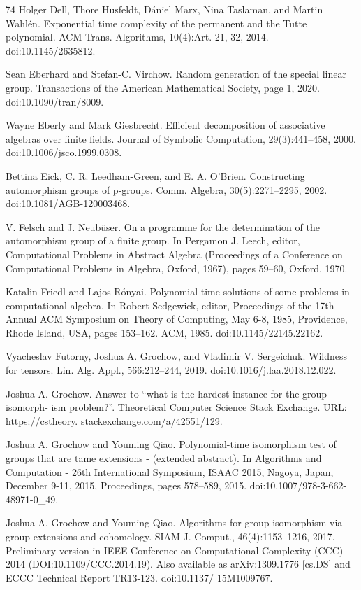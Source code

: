 \documentclass[10pt,a4paper]{article}
\begin{document}
\begin{thebibliography}{74}
Holger Dell, Thore Husfeldt, Dániel Marx, Nina Taslaman, and Martin Wahlén. Exponential time complexity of the permanent and the Tutte polynomial. ACM Trans. Algorithms, 10(4):Art. 21, 32, 2014. doi:10.1145/2635812.

Sean Eberhard and Stefan-C. Virchow. Random generation of the special linear group. Transactions of the American Mathematical Society, page 1, 2020. doi:10.1090/tran/8009.

Wayne Eberly and Mark Giesbrecht. Efficient decomposition of associative algebras over finite fields. Journal of Symbolic Computation, 29(3):441–458, 2000. doi:10.1006/jsco.1999.0308.

Bettina Eick, C. R. Leedham-Green, and E. A. O’Brien. Constructing automorphism groups of p-groups. Comm. Algebra, 30(5):2271–2295, 2002. doi:10.1081/AGB-120003468.

V. Felsch and J. Neubüser. On a programme for the determination of the automorphism group of a finite group. In Pergamon J. Leech, editor, Computational Problems in Abstract Algebra (Proceedings of a Conference on Computational Problems in Algebra, Oxford, 1967), pages 59–60, Oxford, 1970.

Katalin Friedl and Lajos Rónyai. Polynomial time solutions of some problems in computational algebra. In Robert Sedgewick, editor, Proceedings of the 17th Annual ACM Symposium on Theory of Computing, May 6-8, 1985, Providence, Rhode Island, USA, pages 153–162. ACM, 1985. doi:10.1145/22145.22162.

Vyacheslav Futorny, Joshua A. Grochow, and Vladimir V. Sergeichuk. Wildness for tensors. Lin. Alg. Appl., 566:212–244, 2019. doi:10.1016/j.laa.2018.12.022.

Joshua A. Grochow. Answer to “what is the hardest instance for the group isomorph- ism problem?”. Theoretical Computer Science Stack Exchange. URL: https://cstheory. stackexchange.com/a/42551/129.

Joshua A. Grochow and Youming Qiao. Polynomial-time isomorphism test of groups that are tame extensions - (extended abstract). In Algorithms and Computation - 26th International Symposium, ISAAC 2015, Nagoya, Japan, December 9-11, 2015, Proceedings, pages 578–589, 2015. doi:10.1007/978-3-662-48971-0\_49.

Joshua A. Grochow and Youming Qiao. Algorithms for group isomorphism via group extensions and cohomology. SIAM J. Comput., 46(4):1153–1216, 2017. Preliminary version in IEEE Conference on Computational Complexity (CCC) 2014 (DOI:10.1109/CCC.2014.19). Also available as arXiv:1309.1776 [cs.DS] and ECCC Technical Report TR13-123. doi:10.1137/ 15M1009767.


\end{thebibliography}
\end{document}
